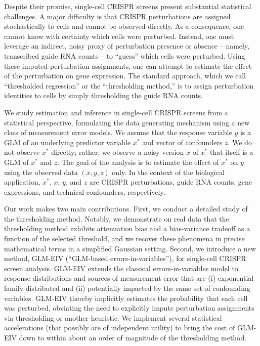 \documentclass[11pt]{article}
\begin{document}
Despite their promise, single-cell CRISPR screens present substantial statistical challenges. A major difficulty is that CRISPR perturbations are assigned stochastically to cells and cannot be observed directly. As a consequence, one cannot know with certainty which cells were perturbed. Instead, one must leverage an indirect, noisy proxy of perturbation presence or absence -- namely, transcribed guide RNA counts -- to ``guess'' which cells were perturbed. Using these imputed perturbation assignments, one can attempt to estimate the effect of the perturbation on gene expression. The standard approach, which we call ``thresholded regression'' or the ``thresholding method,'' is to assign perturbation identities to cells by simply thresholding the guide RNA counts.

We study estimation and inference in single-cell CRISPR screens from a statistical perspective, formulating the data generating mechanism using a new class of measurement error models. We assume that the response variable $y$ is a GLM of an underlying predictor variable $x^*$ and vector of confounders $z$. We do not observe $x^*$ directly; rather, we observe a noisy version $x$ of $x^*$ that itself is a GLM of $x^*$ and $z$. The goal of the analysis is to estimate the effect of $x^*$ on $y$ using the observed data $(x, y, z)$ only. In the context of the biological application, $x^*$, $x$, $y$, and $z$ are CRISPR perturbations, guide RNA counts, gene expressions, and technical confounders, respectively.

Our work makes two main contributions. First, we conduct a detailed study of the thresholding method. Notably, we demonstrate on real data that the thresholding method exhibits attenuation bias and a bias-variance tradeoff as a function of the selected threshold, and we recover these phenomena in precise mathematical terms in a simplified Gaussian setting. Second, we introduce a new method, GLM-EIV (``GLM-based errors-in-variables''), for single-cell CRISPR screen analysis. GLM-EIV extends the classical errors-in-variables model to response distributions and sources of measurement error that are (i) exponential family-distributed and (ii) potentially impacted by the same set of confounding variables. GLM-EIV thereby implicitly estimates the probability that each cell was perturbed, obviating the need to explicitly impute perturbation assignments via thresholding or another heuristic. %
We implement several statistical accelerations (that possibly are of independent utility) to bring the cost of GLM-EIV down to within about an order of magnitude of the thresholding method.
\end{document}
